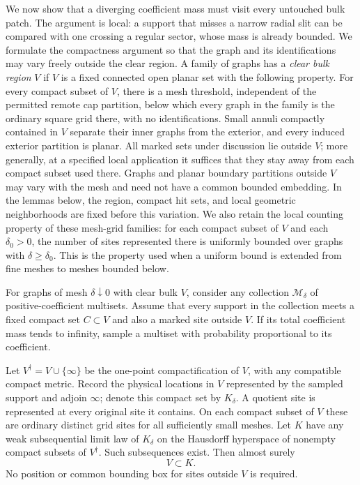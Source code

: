 We now show that a diverging coefficient mass must visit every untouched
bulk patch.  The argument is local: a support that misses a narrow radial
slit can be compared with one crossing a regular sector, whose mass is
already bounded.  We formulate the compactness argument so that the
graph and its identifications may vary freely outside the clear region.
A family of graphs has a \emph{clear bulk region} $V$ if $V$ is a fixed
connected open planar set with the following property.  For every
compact subset of $V$, there is a mesh threshold, independent of the
permitted remote cap partition, below which every graph in the family
is the ordinary square grid there, with no identifications.  Small
annuli compactly contained in $V$ separate their inner graphs from
the exterior, and every induced exterior partition is planar.
All marked sets under discussion lie outside $V$; more generally, at
a specified local application it suffices that they stay away from
each compact subset used there.  Graphs and planar boundary partitions
outside $V$ may vary with the mesh and need not have a common bounded
embedding.  In the lemmas below, the region, compact hit sets, and
local geometric neighborhoods are fixed before this variation.  We also
retain the local counting property of these mesh-grid families: for
each compact subset of $V$ and each $\delta_0>0$, the number of sites
represented there is uniformly bounded over graphs with
$\delta\ge\delta_0$.  This is the property used when a uniform bound
is extended from fine meshes to meshes bounded below.

\begin{lemma}
\label{sector:dense-mass}
For graphs of mesh $\delta\downarrow0$ with clear bulk $V$, consider
any collection $\mathcal M_\delta$ of positive-coefficient multisets.
Assume that every support in the collection meets a fixed compact
set $C\subset V$ and also a marked site outside $V$.  If its total
coefficient mass tends to infinity, sample a multiset with probability
proportional to its coefficient.

Let $V^\dagger=V\cup\{\infty\}$ be the one-point compactification of
$V$, with any compatible compact metric.  Record the physical locations
in $V$ represented by the sampled support and adjoin $\infty$; denote
this compact set by $K_\delta$.  A quotient site is represented at
every original site it contains.  On each compact subset of $V$ these
are ordinary distinct grid sites for all sufficiently small meshes.
Let $K$ have any weak subsequential limit law of $K_\delta$ on the
Hausdorff hyperspace of nonempty compact subsets of $V^\dagger$.
Such subsequences exist.  Then almost surely
\begin{equation}
 V\subset K.
 \label{sector:full-bulk-limit}
\end{equation}
No position or common bounding box for sites outside $V$ is required.
\end{lemma}

